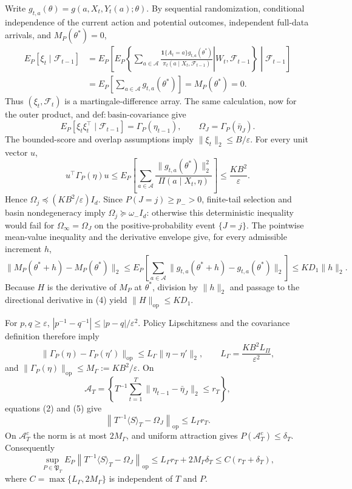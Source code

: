 Write \(g_{t,a}(\theta)=g(a,X_t,Y_t(a);\theta)\). By sequential randomization, conditional independence of the current action and potential outcomes, independent full-data arrivals, and \(M_P(\theta^*)=0\),
\[
\begin{aligned}
E_P[\xi_t\mid\mathcal F_{t-1}]
&=E_P\!\left[E_P\!\left\{\left.\sum_{a\in\mathcal A}
 \frac{\mathbf 1\{A_t=a\}g_{t,a}(\theta^*)}
 {\pi_t(a\mid X_t,\mathcal F_{t-1})}
 \right|W_t,\mathcal F_{t-1}\right\}\middle|\mathcal F_{t-1}\right]\\
&=E_P\!\left[\sum_{a\in\mathcal A}g_{t,a}(\theta^*)\right]
=M_P(\theta^*)=0.
\end{aligned}
\tag{1}
\]
Thus \((\xi_t,\mathcal F_t)\) is a martingale-difference array. The same calculation, now for the outer product, and \(\mathrm{def:basin\text{-}covariance}\) give
\[
 E_P[\xi_t\xi_t^\top\mid\mathcal F_{t-1}]
 =\Gamma_P(\eta_{t-1}),\qquad \Omega_J=\Gamma_P(\bar\eta_J).
\tag{2}
\]
The bounded-score and overlap assumptions imply \(\|\xi_t\|_2\le B/\varepsilon\). For every unit vector \(u\),
\[
 u^\top\Gamma_P(\eta)u
 \le E_P\!\left[\sum_{a\in\mathcal A}
 \frac{\|g_{t,a}(\theta^*)\|_2^2}{\Pi(a\mid X_t,\eta)}\right]
 \le \frac{KB^2}{\varepsilon}.
\tag{3}
\]
Hence \(\Omega_j\preceq(KB^2/\varepsilon)I_d\). Since \(P(J=j)\ge p_->0\), finite-tail selection and basin nondegeneracy imply \(\Omega_j\succeq\omega_-I_d\): otherwise this deterministic inequality would fail for \(\Omega_\infty=\Omega_J\) on the positive-probability event \(\{J=j\}\). The pointwise mean-value inequality and the derivative envelope give, for every admissible increment \(h\),
\[
 \|M_P(\theta^*+h)-M_P(\theta^*)\|_2
 \le E_P\!\left[\sum_{a\in\mathcal A}
 \|g_{t,a}(\theta^*+h)-g_{t,a}(\theta^*)\|_2\right]
 \le KD_1\|h\|_2.
\tag{4}
\]
Because \(H\) is the derivative of \(M_P\) at \(\theta^*\), division by \(\|h\|_2\) and passage to the directional derivative in (4) yield \(\|H\|_{\mathrm{op}}\le KD_1\).

For \(p,q\ge\varepsilon\), \(|p^{-1}-q^{-1}|\le |p-q|/\varepsilon^2\). Policy Lipschitzness and the covariance definition therefore imply
\[
 \|\Gamma_P(\eta)-\Gamma_P(\eta')\|_{\mathrm{op}}
 \le L_\Gamma\|\eta-\eta'\|_2,\qquad
 L_\Gamma=\frac{KB^2L_\Pi}{\varepsilon^2},
\tag{5}
\]
and \(\|\Gamma_P(\eta)\|_{\mathrm{op}}\le M_\Gamma:=KB^2/\varepsilon\). On
\[
 \mathcal A_T=\left\{T^{-1}\sum_{t=1}^T
 \|\eta_{t-1}-\bar\eta_J\|_2\le r_T\right\},
\]
equations (2) and (5) give
\[
 \left\|T^{-1}\langle S\rangle_T-\Omega_J\right\|_{\mathrm{op}}
 \le L_\Gamma r_T.
\tag{6}
\]
On \(\mathcal A_T^c\) the norm is at most \(2M_\Gamma\), and uniform attraction gives \(P(\mathcal A_T^c)\le\delta_T\). Consequently
\[
 \sup_{P\in\mathfrak P_T}E_P\!\left\|T^{-1}\langle S\rangle_T-
 \Omega_J\right\|_{\mathrm{op}}
 \le L_\Gamma r_T+2M_\Gamma\delta_T
 \le C(r_T+\delta_T),
\tag{7}
\]
where \(C=\max\{L_\Gamma,2M_\Gamma\}\) is independent of \(T\) and \(P\).

